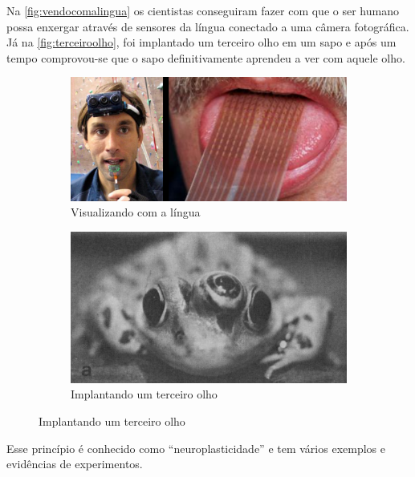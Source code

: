 Na \autoref{fig:vendocomalingua} os cientistas conseguiram fazer com que o ser humano possa enxergar através de sensores da língua conectado a uma câmera fotográfica. Já na \autoref{fig:terceiroolho}, foi implantado um terceiro olho em um sapo e após um tempo comprovou-se que o sapo definitivamente aprendeu a ver com aquele olho.


\begin{figure}
  \caption{Exemplos de representação de sensores no cérebro}
  \begin{subfigure}[htb]{0.5\textwidth} 
    \includegraphics[width=\textwidth]{img/seeingtongue}
    \caption{Visualizando com a língua} \label{fig:vendocomalingua}
  \end{subfigure} 
  \begin{subfigure}[htb]{0.41\textwidth}
    \includegraphics[width=\textwidth]{img/thirdeye}
    \caption{Implantando um terceiro olho} \label{fig:terceiroolho}
  \end{subfigure} 

\end{figure}

Esse princípio é conhecido como ``neuroplasticidade'' e tem vários exemplos e evidências de experimentos.

